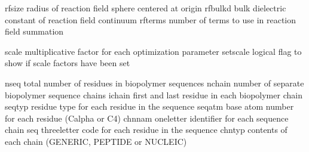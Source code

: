 \documentclass[letterpaper,11pt,english]{sphinxmanual}
\begin{document}
\sphinxAtStartPar
{}

\begin{sphinxVerbatim}[commandchars=\\\{\}]
rfsize          radius of reaction field sphere centered at origin
rfbulkd         bulk dielectric constant of reaction field continuum
rfterms         number of terms to use in reaction field summation
\end{sphinxVerbatim}

\sphinxAtStartPar
{}

\begin{sphinxVerbatim}[commandchars=\\\{\}]
scale           multiplicative factor for each optimization parameter
set\PYGZus{}scale       logical flag to show if scale factors have been set
\end{sphinxVerbatim}

\sphinxAtStartPar
{}

\begin{sphinxVerbatim}[commandchars=\\\{\}]
nseq            total number of residues in biopolymer sequences
nchain          number of separate biopolymer sequence chains
ichain          first and last residue in each biopolymer chain
seqtyp          residue type for each residue in the sequence
seqatm          base atom number for each residue (Calpha or C4\PYGZsq{})
chnnam          one\PYGZhy{}letter identifier for each sequence chain
seq             three\PYGZhy{}letter code for each residue in the sequence
chntyp          contents of each chain (GENERIC, PEPTIDE or NUCLEIC)
\end{sphinxVerbatim}

\sphinxAtStartPar
{}
\end{document}
